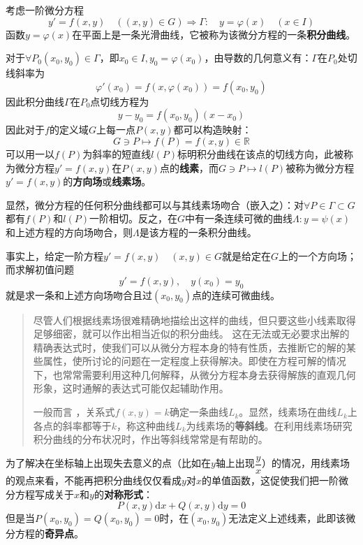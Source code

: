 \documentclass[UTF8]{book}
\newcommand{\R}{\mathbb{R}}
\renewcommand{\d}{\mathrm{d}}
\newcommand{\To}{\Longrightarrow}
\begin{document}
    考虑一阶微分方程$$ y'=f(x,y)\quad ((x,y)\in G) \To \Gamma:\quad y=\varphi(x)\quad(x\in I) $$
    函数$ y=\varphi(x) $在平面上是一条光滑曲线，它被称为该微分方程的一条\textbf{积分曲线}。

    对于$ \forall P_0(x_0,y_0)\in\Gamma $，即$ x_0\in I,y_0=\varphi(x_0) $，由导数的几何意义有：$ \Gamma $在$ P_0 $处切线斜率为$$ \varphi'(x_0)=f(x,\varphi(x_0))=f(x_0,y_0) $$
    因此积分曲线$ \Gamma $在$ P_0 $点切线方程为$$ y-y_0=f(x_0,y_0)(x-x_0) $$
    因此对于$ f $的定义域$ G $上每一点$ P(x,y) $都可以构造映射：$$ G\ni P\mapsto f(P)=f(x,y)\in \R $$
    可以用一以$ f(P) $为斜率的短直线$ l(P) $标明积分曲线在该点的切线方向，此被称为微分方程$ y'=f(x,y) $在$ P(x,y) $点的\textbf{线素}，而$ G\ni P\mapsto l(P) $被称为微分方程$ y'=f(x,y) $的\textbf{方向场}或\textbf{线素场}。

    显然，微分方程的任何积分曲线都可以与其线素场吻合（嵌入之）：对$ \forall P\in \Gamma\subset G $都有$ f(P) $和$ l(P) $一阶相切。反之，在$ G $中有一条连续可微的曲线$ \Lambda:y=\psi(x) $和上述方程的方向场吻合，则$ \Lambda $是该方程的一条积分曲线。

    事实上，给定一阶方程$ y'=f(x,y) \quad (x,y)\in G$就是给定在$ G $上的一个方向场；而求解初值问题$$ y'=f(x,y),\quad y(x_0)=y_0 $$ 就是求一条和上述方向场吻合且过$ (x_0,y_0) $点的连续可微曲线。
    \begin{quotation}
        尽管人们根据线素场很难精确地描绘出这样的曲线，但只要这些小线素取得足够细密，就可以作出相当近似的积分曲线。 这在无法或无必要求出解的精确表达式时，使我们可以从微分方程本身的特有性质，去推断它的解的某些属性，使所讨论的问题在一定程度上获得解决。即使在方程可解的情况下，也常常需要利用这种几何解释，从微分方程本身去获得解族的直观几何形象，这时通解的表达式可能仅起辅助作用。

        一般而言 ，关系式$ f(x,y)= k $确定一条曲线$ L_k $。显然，线素场在曲线$ L_k $上各点的斜率都等于$ k $，称这种曲线$ L_k $为线素场的\textbf{等斜线}。在利用线素场研究积分曲线的分布状况时，作出等斜线常常是有帮助的。
    \end{quotation}
    为了解决在坐标轴上出现失去意义的点（比如在$ y $轴上出现$ \dfrac{y}{x} $）的情况，用线素场的观点来看，不能再把积分曲线仅仅看成$ y $对$ x $的单值函数，这促使我们把一阶微分方程写成关于$ x $和$ y $的\textbf{对称形式}：$$ P(x,y)\d x+Q(x,y)\d y=0 $$
    但是当$ P(x_0,y_0)=Q(x_0,y_0)=0 $时，在$ (x_0,y_0) $无法定义上述线素，此即该微分方程的\textbf{奇异点}。
\end{document}

